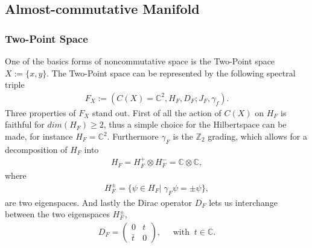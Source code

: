 \subsection{Almost-commutative Manifold\label{sec:5}}
\subsubsection{Two-Point Space}
One of the basics forms of noncommutative space is the Two-Point space $X
:= \{x, y\}$. The Two-Point space can be represented by the following spectral triple
\begin{align}
    F_X := (C(X) = \mathbb{C}^2, H_F, D_F; J_F, \gamma _f).
\end{align}
Three properties of $F_X$ stand out. First of all the action of $C(X)$ on
$H_F$ is faithful for $dim(H_F) \geq 2$, thus a simple choice for the
Hilbertspace can be made, for instance $H_F = \mathbb{C}^2$. Furthermore
$\gamma_F$ is the $\mathbb{Z}_2$ grading, which allows for a decomposition of
$H_F$ into
\begin{align}
   H_F = H_F^+ \otimes H_F^- = \mathbb{C} \otimes \mathbb{C},
\end{align}
where
\begin{align}
    H_F^\pm = \{\psi \in H_F |\; \gamma_F\psi = \pm \psi\},
\end{align}
are two eigenspaces. And lastly the Dirac operator $D_F$ lets us
interchange between the two eigenspaces $H_F^\pm$,
\begin{align}
    D_F =
        \begin{pmatrix}0 & t \\ \bar{t} & 0\end{pmatrix},  \;\;\;\;\;
            \text{with} \;\; t\in\mathbb{C}.
\end{align}

